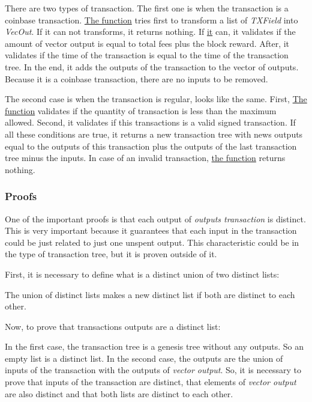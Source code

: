 
There are two types of transaction.
The first one is when the transaction is a coinbase transaction.
\hyperref[addtxtree1]{The function} tries first to transform a list of \emph{TXField} into \emph{VecOut}.
If it can not transforms, it returns nothing.
If \hyperref[addtxtree1]{it} can, it validates if the amount of vector output is
equal to total fees plus the block reward.
After, it validates if the time of the transaction is equal to the time of the transaction tree.
In the end, it adds the outputs of the transaction to the vector of outputs.
Because it is a coinbase transaction, there are no inputs to be removed.


The second case is when the transaction is regular, looks like the same.
First, \hyperref[addtxtree2]{The function} validates if the quantity of transaction is less
than the maximum allowed.
Second, it validates if this transactions is a valid signed transaction.
If all these conditions are true, it returns a new transaction tree
with news outputs equal to the outputs of this transaction plus the outputs of the last transaction tree
minus the inputs.
In case of an invalid transaction, \hyperref[addtxtree2]{the function} returns nothing.

\subsubsection{Proofs}

One of the important proofs is that each output of \emph{outputs transaction} is distinct.
This is very important because it guarantees that each input in the transaction could be
just related to just one unspent output.
This characteristic could be in the type of transaction tree,
but it is proven outside of it.

First, it is necessary to define what is a distinct union of two distinct lists:


The union of distinct lists makes a new distinct list if both are distinct to each other.

Now, to prove that transactions outputs are a distinct list:


In the first case, the transaction tree is a genesis tree without any outputs.
So an empty list is a distinct list.
In the second case, the outputs are the union of inputs of the transaction with the outputs
of \emph{vector output}.
So, it is necessary to prove that inputs of the transaction are distinct,
that elements of \emph{vector output} are also distinct and that both lists are distinct to each other.

